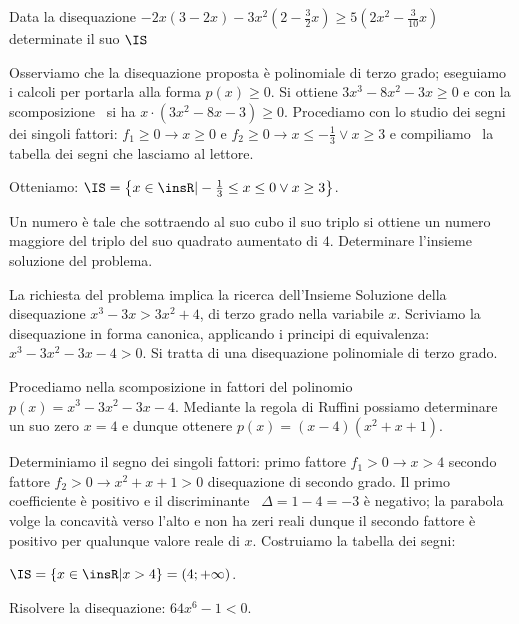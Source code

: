 \begin{exrig}
\begin{esempio}
\end{esempio}

\begin{esempio}
Data la disequazione $-2x(3-2x)-3x^2\left(2-\frac 3 2x\right)\ge 
5\left(2x^2-\frac 3{10}x\right)$ determinate il suo $ \IS $

Osserviamo che la disequazione proposta è polinomiale di terzo grado; eseguiamo 
i calcoli per portarla alla forma $p(x)\ge 0$. Si ottiene $3x^3-8x^2-3x\ge 0$ e 
con la scomposizione \ si ha $x\cdot (3x^2-8x-3)\ge 0$. Procediamo con lo studio 
dei segni dei singoli fattori: $f_1\ge 0\rightarrow x\ge 0$ e $f_2\ge 
0\rightarrow x\le -\frac 1 3\vee x\ge 3$ e compiliamo \ la tabella dei segni che 
lasciamo al lettore.
\begin{center}
 
\end{center}
Otteniamo: $\IS=\left\{x\in \insR | -\frac 1 3\le x\le 0\vee x\ge 3\right\}$.
\end{esempio}

\begin{esempio}
Un numero è tale che sottraendo al suo cubo il suo triplo si ottiene un numero 
maggiore del triplo del suo quadrato aumentato di $ 4 $. Determinare l'insieme 
soluzione del problema.

La richiesta del problema implica la ricerca dell'Insieme Soluzione della 
disequazione $x^3-3x>3x^2+4$, di terzo grado nella variabile $x$. Scriviamo la 
disequazione in forma canonica, applicando i principi di equivalenza: 
$x^3-3x^2-3x-4>0$. Si tratta di una disequazione polinomiale di terzo grado.

Procediamo nella scomposizione in fattori del polinomio $p(x)=x^3-3x^2-3x-4$. 
Mediante la regola di Ruffini possiamo determinare un suo zero $x=4$ e dunque 
ottenere $p(x)=(x-4)(x^2+x+1)$.

Determiniamo il segno dei singoli fattori: primo fattore $f_1>0\to x>4$ secondo 
fattore $f_2>0\to x^2+x+1>0$ disequazione di secondo grado. Il primo 
coefficiente è positivo e il discriminante \ $\Delta =1-4=-3$ è negativo; la 
parabola volge la concavità verso l'alto e non ha zeri reali dunque il secondo 
fattore è positivo per qualunque valore reale di $x$. Costruiamo la tabella dei 
segni:
\begin{center}
 
\end{center}
$\IS=\{x\in \insR | x>4\}=(4;+\infty )$.
\end{esempio}

\begin{esempio}
Risolvere la disequazione: $64x^6-1<0$.


\end{esempio}
\end{exrig}
